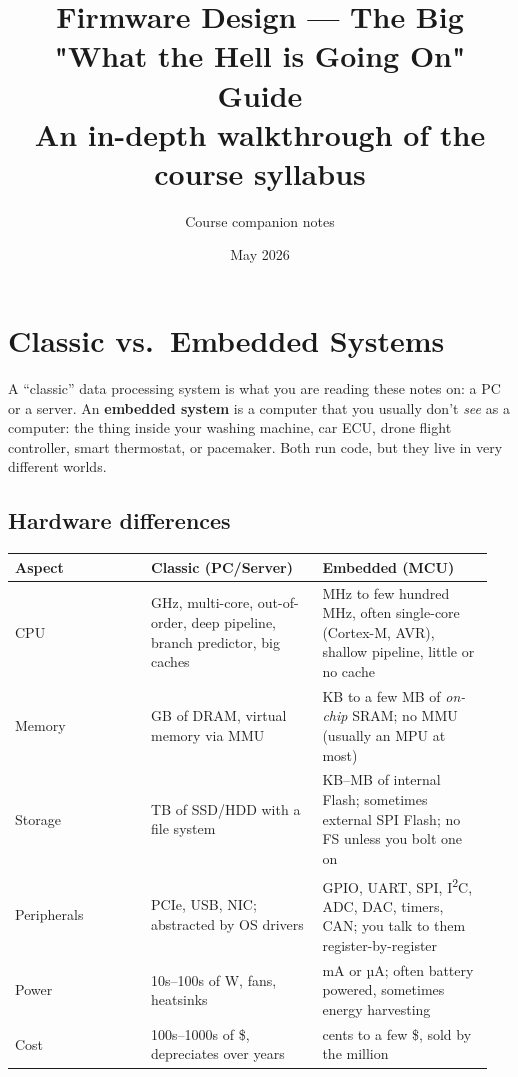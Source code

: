 \documentclass[11pt,a4paper]{article}
\title{\textbf{Firmware Design --- The Big "What the Hell is Going On" Guide}\\
       \large An in-depth walkthrough of the course syllabus}
\author{Course companion notes}
\date{May 2026}
\begin{document}
\maketitle
\tableofcontents
\newpage

\section{Classic vs.\ Embedded Systems}

A ``classic'' data processing system is what you are reading these notes on:
a PC or a server. An \textbf{embedded system} is a computer that you usually
don't \emph{see} as a computer: the thing inside your washing machine, car ECU,
drone flight controller, smart thermostat, or pacemaker. Both run code, but
they live in very different worlds.

\subsection{Hardware differences}

\begin{tabular}{p{0.27\linewidth} p{0.34\linewidth} p{0.34\linewidth}}
\toprule
\textbf{Aspect} & \textbf{Classic (PC/Server)} & \textbf{Embedded (MCU)} \\
\midrule
CPU & GHz, multi-core, out-of-order, deep pipeline, branch predictor, big caches & MHz to few hundred MHz, often single-core (Cortex-M, AVR), shallow pipeline, little or no cache \\
Memory & GB of DRAM, virtual memory via MMU & KB to a few MB of \emph{on-chip} SRAM; no MMU (usually an MPU at most) \\
Storage & TB of SSD/HDD with a file system & KB--MB of internal Flash; sometimes external SPI Flash; no FS unless you bolt one on \\
Peripherals & PCIe, USB, NIC; abstracted by OS drivers & GPIO, UART, SPI, I\textsuperscript{2}C, ADC, DAC, timers, CAN; you talk to them register-by-register \\
Power & 10s--100s of W, fans, heatsinks & mA or µA; often battery powered, sometimes energy harvesting \\
Cost & 100s--1000s of \$, depreciates over years & cents to a few \$, sold by the million \\
\bottomrule
\end{tabular}
\end{document}
